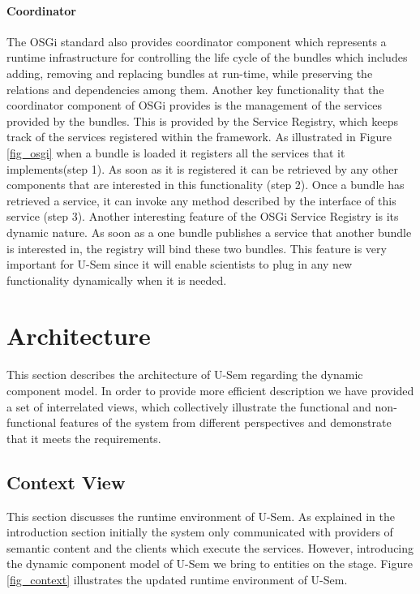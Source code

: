 \paragraph{Coordinator}
The OSGi standard also provides coordinator component which represents a runtime infrastructure for controlling the life cycle of the bundles which includes adding, removing and replacing bundles at run-time, while preserving the relations and dependencies among them. Another key functionality that the coordinator component of OSGi provides is the management of the services provided by the bundles. This is provided by the Service Registry, which keeps track of the services registered within the framework. As illustrated in Figure \ref{fig_osgi} when a bundle is loaded it registers all the services that it implements(step 1). As soon as it is registered it can be retrieved by any other components that are interested in this functionality (step 2). Once a bundle has retrieved a service, it can invoke any method described by the interface of this service (step 3). Another interesting feature of the OSGi Service Registry is its dynamic nature. As soon as a one bundle publishes a service that another bundle is interested in, the registry will bind these two bundles. This feature is very important for U-Sem since it will enable scientists to plug in any new functionality dynamically when it is needed.


\section{Architecture}

This section describes the architecture of U-Sem regarding the dynamic component model. In order to provide more efficient description we have provided a set of interrelated views, which collectively illustrate the functional and non-functional features of the system from different perspectives and demonstrate that it meets the requirements.

\subsection{Context View}

This section discusses the runtime environment of U-Sem. As explained in the introduction section initially the system only communicated with providers of semantic content and the clients which execute the services. However, introducing the dynamic component model of U-Sem we bring to entities on the stage. Figure \ref{fig_context} illustrates the updated runtime environment of U-Sem.

